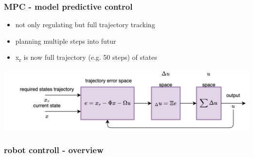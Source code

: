 \documentclass{beamer}
\begin{document}
\begin{frame}
  \frametitle{\bf MPC - model predictive control}

  \begin{itemize}
    \item not only regulating but full trajectory tracking
    \item planning multiple steps into futur
    \item x\textsubscript{r} is now full trajectory (e.g. 50 steps) of states
  \end{itemize}

  {\centering \includegraphics[scale=0.6]{../diagrams/controll/control-mpc.png}}

\end{frame}



\begin{frame}
  
  \frametitle{\bf robot controll - overview}


\end{frame}
\end{document}
